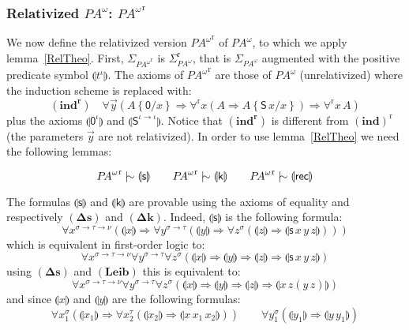 \documentclass{CSML}
\newcommand*\Derives{\mathrel{|\mkern-8.75mu\sim}}
\newcommand*\SortTo\to
\newcommand*\SortA{\sigma}
\newcommand*\SortB{\tau}
\newcommand*\SortC{\nu}
\newcommand*\LogSortedTerm[2]{#1^{#2}}
\newcommand*\LogTermA{t}
\newcommand*\LogVarA{x}
\newcommand*\LogVarB{y}
\newcommand*\LogVarC{z}
\newcommand*\LogConst[1]{\mathsf{#1}}
\newcommand*\LogImp{\mathbin{\Rightarrow}}
\newcommand*\LogRel[1]{\llparenthesis#1\rrparenthesis}
\newcommand*\LogRelForm[1]{{#1^\mathrm{r}}}
\newcommand*\LogForallRel{\forall^\mathrm{r}}
\newcommand*\LogFormA{A}
\newcommand*\LogSubst[1]{\left\{#1\right\}}
\newcommand*\PA{{P\!A}}
\newcommand*\PAom{{\PA^\omega}}
\newcommand*\CASort\iota
\newcommand*\CALogs{\LogConst{s}}
\newcommand*\CALogk{\LogConst{k}}
\newcommand*\CALogZ{\LogConst{0}}
\newcommand*\CALogZSort{\CASort}
\newcommand*\CALogS{\LogConst{S}}
\newcommand*\CALogSSort{\CASort\SortTo\CASort}
\newcommand*\CALogrec{\LogConst{rec}}
\newcommand*\CAAxName[1]{{\bm{\scriptstyle(#1)}}}
\newcommand*\CALeibName{\CAAxName{Leib}}
\newcommand*\CAdefsName{\CAAxName{\Delta s}}
\newcommand*\CAdefkName{\CAAxName{\Delta k}}
\newcommand*\CAindUnrelName{\CAAxName{ind}}
\newcommand*\CAindName{\CAAxName{ind^r}}
\newcommand*\CAindNoType[1]{\forall\vec{\LogVarB}\left(#1\LogSubst{\CALogZ/\LogVarA}\LogImp\LogForallRel\LogVarA\left(#1\LogImp#1\LogSubst{\CALogS\,\LogVarA/\LogVarA}\right)\LogImp\LogForallRel\LogVarA\,#1\right)}
\newcommand*\CARelsNoType{\LogRel{\CALogs}}
\newcommand*\CARelkNoType{\LogRel{\CALogk}}
\newcommand*\CARelZ{\LogRel{\LogSortedTerm{\CALogZ}{\CALogZSort}}}
\newcommand*\CARelS{\LogRel{\LogSortedTerm{\CALogS}{\CALogSSort}}}
\newcommand*\CARelrecNoType{\LogRel{\CALogrec}}
\begin{document}
\subsubsection{Relativized \texorpdfstring{$\PAom$}{PAomega}: \texorpdfstring{$\LogRelForm{\PAom}$}{PAomegar}}
We now define the relativized version $\LogRelForm{\PAom}$ of $\PAom$, to which we apply lemma~\ref{RelTheo}. First, $\Sigma_\LogRelForm{\PAom}$ is $\LogRelForm{\Sigma_\PAom}$, that is $\Sigma_\PAom$ augmented with the positive predicate symbol $\LogRel{\LogSortedTerm{\LogTermA}{\CASort}}$. The axioms of $\LogRelForm{\PAom}$ are those of $\PAom$ (unrelativized) where the induction scheme is replaced with:
$$\CAindName\quad\CAindNoType{\LogFormA}$$
plus the axioms $\CARelZ$ and $\CARelS$. Notice that $\CAindName$ is different from $\LogRelForm{\CAindUnrelName}$ (the parameters $\vec{\LogVarB}$ are not relativized). In order to use lemma~\ref{RelTheo} we need the following lemmas:
\begin{lem}
$$\LogRelForm{\PAom}\Derives\CARelsNoType\qquad\LogRelForm{\PAom}\Derives\CARelkNoType\qquad\LogRelForm{\PAom}\Derives\CARelrecNoType$$
\end{lem}
\proof
The formulas $\CARelsNoType$ and $\CARelkNoType$ are provable using the axioms of equality and respectively $\CAdefsName$ and $\CAdefkName$. Indeed, $\CARelsNoType$ is the following formula:
$$\forall\LogSortedTerm{\LogVarA}{\SortA\SortTo\SortB\SortTo\SortC}\left(\LogRel{\LogVarA}\LogImp\forall\LogSortedTerm{\LogVarB}{\SortA\SortTo\SortB}\left(\LogRel{\LogVarB}\LogImp\forall\LogSortedTerm{\LogVarC}{\sigma}\left(\LogRel{\LogVarC}\LogImp\LogRel{\CALogs\,\LogVarA\,\LogVarB\,\LogVarC}\right)\right)\right)$$
which is equivalent in first-order logic to:
$$\forall\LogSortedTerm{\LogVarA}{\SortA\SortTo\SortB\SortTo\SortC}\forall\LogSortedTerm{\LogVarB}{\SortA\SortTo\SortB}\forall\LogSortedTerm{\LogVarC}{\SortA}\left(\LogRel{\LogVarA}\LogImp\LogRel{\LogVarB}\LogImp\LogRel{\LogVarC}\LogImp\LogRel{\CALogs\,\LogVarA\,\LogVarB\,\LogVarC}\right)$$
using $\CAdefsName$ and $\CALeibName$ this is equivalent to:
$$\forall\LogSortedTerm{\LogVarA}{\SortA\SortTo\SortB\SortTo\SortC}\forall\LogSortedTerm{\LogVarB}{\SortA\SortTo\SortB}\forall\LogSortedTerm{\LogVarC}{\SortA}\left(\LogRel{\LogVarA}\LogImp\LogRel{\LogVarB}\LogImp\LogRel{\LogVarC}\LogImp\LogRel{\LogVarA\,\LogVarC\left(\LogVarB\,\LogVarC\right)}\right)$$
and since $\LogRel{\LogVarA}$ and $\LogRel{\LogVarB}$ are the following formulas:
$$\forall\LogSortedTerm{\LogVarA_1}{\SortA}\left(\LogRel{\LogVarA_1}\LogImp\forall\LogSortedTerm{\LogVarA_2}{\SortB}\left(\LogRel{\LogVarA_2}\LogImp\LogRel{\LogVarA\,\LogVarA_1\,\LogVarA_2}\right)\right)\qquad\forall\LogSortedTerm{\LogVarB_1}{\SortA}\left(\LogRel{\LogVarB_1}\LogImp\LogRel{\LogVarB\,\LogVarB_1}\right)$$
\end{document}
